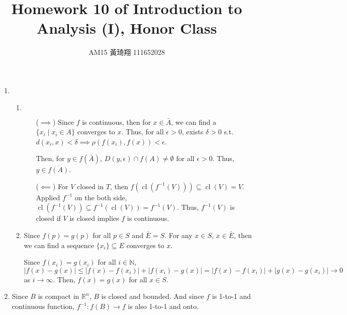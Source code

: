 \documentclass[12pt]{article}
\title{Homework 10 of Introduction to Analysis (I), Honor Class}
\author{AM15 黃琦翔 111652028}
\DeclareMathOperator{\closure}{cl}
\begin{document}
\maketitle
\begin{enumerate}
    \item \begin{enumerate}
        \item $\ $
        \begin{enumerate}
            \item[($\implies$)] Since $f$ is continuous, then for $x\in \bar{A}$, 
            we can find a $\lbrace x_i\mid x_i\in A\rbrace$ converges to $x$.
            Thus, for all $\epsilon > 0$, exists $\delta > 0$ s.t. $d(x_i, x) < \delta \implies \rho(f(x_i), f(x)) < \epsilon$.

            Then, for $y \in f(\bar{A})$, $D(y, \epsilon)\cap f(A) \neq \emptyset$ for all $\epsilon > 0$.
            Thus, $y \in \overline{f(A)}$.
            
            \item[($\impliedby$)] For $V$ closed in $T$, then $f(\closure(f^{-1}(V))) \subseteq \closure(V) = V$.
            Applied $f^{-1}$ on the both side, $\closure(f^{-1}(V)) \subseteq f^{-1}(\closure(V)) = f^{-1}(V)$.
            Thus, $f^{-1}(V)$ is closed if $V$ is closed implies $f$ is continuous.           

        \end{enumerate}

        \item Since $f(p) = g(p)$ for all $p \in S$ and $\bar{E} = S$.
        For any $x\in S$, $x\in \bar{E}$, then we can find a sequence $\lbrace x_i\rbrace\subseteq E$ converges to $x$.

        Since $f(x_i) = g(x_i)$ for all $i\in \mathbb{N}$, $|f(x) - g(x)| \leq |f(x) - f(x_i)| + |f(x_i) - g(x)| = |f(x) - f(x_i)| + |g(x)- g(x_i)| \to 0$ as $i\to \infty$.
        Then, $f(x) = g(x)$ for all $x\in S$.
    \end{enumerate}

    \item Since $B$ is compact in $\mathbb{R}^n$, $B$ is closed and bounded.
    And since $f$ is 1-to-1 and continuous function, $f^{-1}: f(B) \to f$ is also 1-to-1 and onto.
    
\end{enumerate}
\end{document}
